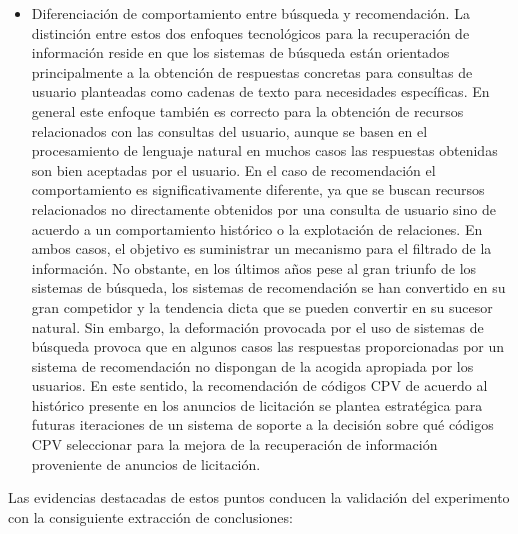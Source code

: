 \begin{itemize}
\item Diferenciación de comportamiento entre búsqueda y recomendación. La distinción 
entre estos dos enfoques tecnológicos para la recuperación de información reside 
en que los sistemas de búsqueda están orientados principalmente a la obtención 
de respuestas concretas para consultas de usuario planteadas como cadenas 
de texto para necesidades específicas. En general este enfoque también es correcto 
para la obtención de recursos relacionados con las consultas del usuario, aunque 
se basen en el procesamiento de lenguaje natural en muchos casos las respuestas 
obtenidas son bien aceptadas por el usuario. En el caso de recomendación 
el comportamiento es significativamente diferente, ya que se buscan recursos relacionados no directamente obtenidos por una consulta de usuario sino 
de acuerdo a un comportamiento histórico o la explotación de relaciones. En ambos casos, 
el objetivo es suministrar un mecanismo para el filtrado de la información. No obstante,
en los últimos años pese al gran triunfo de los sistemas de búsqueda, los sistemas 
de recomendación se han convertido en su gran competidor y la tendencia 
dicta que se pueden convertir en su sucesor natural. Sin embargo, la deformación provocada 
por el uso de sistemas de búsqueda provoca que en algunos casos las respuestas proporcionadas 
por un sistema de recomendación no dispongan de la acogida apropiada por los usuarios. En este sentido, 
la recomendación de códigos CPV de acuerdo al histórico presente en los anuncios de licitación 
se plantea estratégica para futuras iteraciones de un sistema de soporte a la decisión 
sobre qué códigos CPV seleccionar para la mejora de la recuperación de información 
proveniente de anuncios de licitación.
\end{itemize}

Las evidencias destacadas de estos puntos conducen la validación del experimento con la 
consiguiente extracción de conclusiones:

